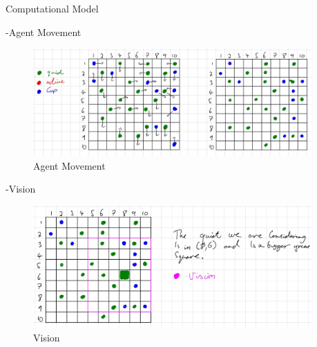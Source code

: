 \documentclass[final,hyperref={pdfpagelabels=false}]{beamer}
\newcommand{\shrink}{-15pt}
\begin{document}
\begin{frame}[t]
\begin{columns}[t]
				
				\begin{column}{.02\textwidth}\end{column} %
				
				\begin{column}{.32\textwidth} %
					\vspace{\shrink}
					\begin{block}{Computational Model}
						
				
					
					-Agent Movement
					\begin{figure}[H]
						\includegraphics[width=\linewidth]{Movement visual.png}
						\caption{Agent Movement}
						\label{fig:frenchriot}
					\end{figure}
					
					-Vision
					\begin{figure}[H]
						\includegraphics[width=\linewidth]{vision for single case.png}
						\caption{Vision}
						\label{fig:frenchriot}
					\end{figure}	
					

\end{block}
\end{column}
\end{columns}
\end{frame}
\end{document}
